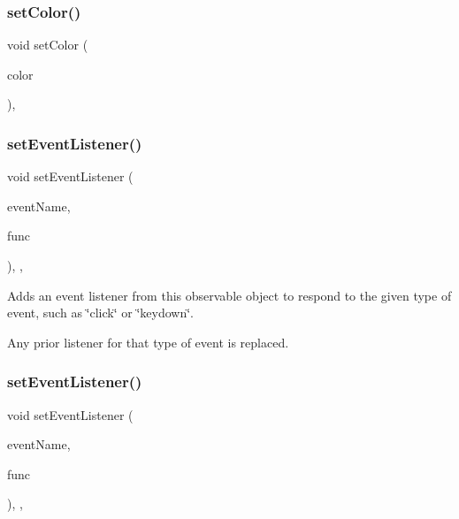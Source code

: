 \subsubsection{\texorpdfstring{set\+Color()}{setColor()}\hspace{0.1cm}{\footnotesize\ttfamily [2/2]}}
{\footnotesize\ttfamily void set\+Color (\begin{DoxyParamCaption}\item[{const std\+::string \&}]{color }\end{DoxyParamCaption})\hspace{0.3cm}{\ttfamily [virtual]}, {\ttfamily [inherited]}}

\mbox{\label{classGObservable_ad2f6d34961c50f6c1e0659990b79f741}} 
\subsubsection{\texorpdfstring{set\+Event\+Listener()}{setEventListener()}\hspace{0.1cm}{\footnotesize\ttfamily [1/2]}}
{\footnotesize\ttfamily void set\+Event\+Listener (\begin{DoxyParamCaption}\item[{const std\+::string \&}]{event\+Name,  }\item[{G\+Event\+Listener}]{func }\end{DoxyParamCaption})\hspace{0.3cm}{\ttfamily [protected]}, {\ttfamily [virtual]}, {\ttfamily [inherited]}}



Adds an event listener from this observable object to respond to the given type of event, such as \char`\"{}click\char`\"{} or \char`\"{}keydown\char`\"{}. 

Any prior listener for that type of event is replaced. \mbox{\label{classGObservable_abac4cb9f9e626e010e87f5d91573c8a5}} 
\subsubsection{\texorpdfstring{set\+Event\+Listener()}{setEventListener()}\hspace{0.1cm}{\footnotesize\ttfamily [2/2]}}
{\footnotesize\ttfamily void set\+Event\+Listener (\begin{DoxyParamCaption}\item[{const std\+::string \&}]{event\+Name,  }\item[{G\+Event\+Listener\+Void}]{func }\end{DoxyParamCaption})\hspace{0.3cm}{\ttfamily [protected]}, {\ttfamily [virtual]}, {\ttfamily [inherited]}}




